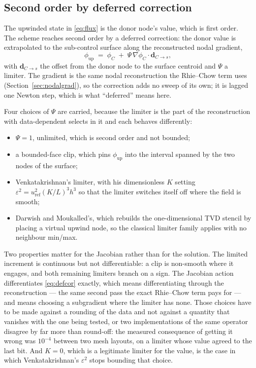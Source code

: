 \documentclass[11pt,a4paper]{article}
\newcommand{\bd}{\mathbf{d}}
\begin{document}
\subsection{Second order by deferred correction}
\label{sec:defcor}

The upwinded state in \eqref{eq:flux} is the donor node's value, which is first order. The
scheme reaches second order by a deferred correction: the donor value is extrapolated to the
sub-control surface along the reconstructed nodal gradient,
\begin{equation}
  \phi_{\mathrm{up}} \;=\; \phi_C \;+\; \Psi \, \nabla \phi_C \cdot \bd_{C \to s} ,
  \label{eq:defcor}
\end{equation}
with $\bd_{C \to s}$ the offset from the donor node to the surface centroid and $\Psi$ a
limiter. The gradient is the same nodal reconstruction the Rhie--Chow term uses
(Section~\ref{sec:nodalgrad}), so the correction adds no sweep of its own; it is lagged one
Newton step, which is what ``deferred'' means here.

Four choices of $\Psi$ are carried, because the limiter is the part of the reconstruction with
data-dependent selects in it and each behaves differently:

\begin{itemize}
  \item $\Psi = 1$, unlimited, which is second order and not bounded;
  \item a bounded-face clip, which pins $\phi_{\mathrm{up}}$ into the interval spanned by the
        two nodes of the surface;
  \item Venkatakrishnan's limiter, with his dimensionless $K$ setting
        $\varepsilon^2 = u_{\mathrm{ref}}^2 (K/L)^3 h^3$ so that the limiter switches itself off
        where the field is smooth;
  \item Darwish and Moukalled's, which rebuilds the one-dimensional TVD stencil by placing a
        virtual upwind node, so the classical limiter family applies with no neighbour min/max.
\end{itemize}

Two properties matter for the Jacobian rather than for the solution. The limited increment is
continuous but not differentiable: a clip is non-smooth where it engages, and both remaining
limiters branch on a sign. The Jacobian action differentiates \eqref{eq:defcor} exactly, which
means differentiating through the reconstruction --- the same second pass the exact Rhie--Chow
term pays for --- and means choosing a subgradient where the limiter has none. Those choices
have to be made against a rounding of the data and not against a quantity that vanishes with
the one being tested, or two implementations of the same operator disagree by far more than
round-off: the measured consequence of getting it wrong was $10^{-4}$ between two mesh layouts,
on a limiter whose value agreed to the last bit. And $K = 0$, which is a legitimate limiter for
the value, is the case in which Venkatakrishnan's $\varepsilon^2$ stops bounding that choice.
\end{document}
